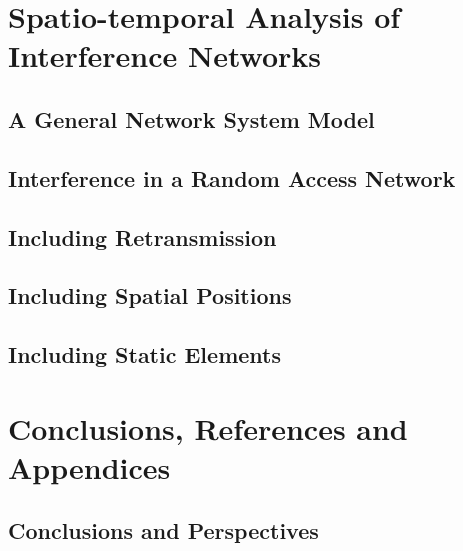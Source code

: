 \part{Spatio-temporal Analysis of Interference Networks}

\chapter{A General Network System Model}
\label{cap:P2_00} \thispagestyle{empty}
\def\printfig{1} %


\chapter{Interference in a Random Access Network}
\label{cap:P2_01} \thispagestyle{empty}
\def\printfig{1} %


\chapter{Including Retransmission}
\label{cap:P2_02} \thispagestyle{empty}
\def\printfig{1} %


\chapter{Including Spatial Positions}
\label{cap:P2_03} \thispagestyle{empty}
\def\printfig{1} %


\chapter{Including Static Elements}
\label{cap:P2_04} \thispagestyle{empty}
\def\printfig{1} %


\part{Conclusions, References and Appendices}

%

\chapter{Conclusions and Perspectives}
\label{cap:P3_01} \thispagestyle{empty}


